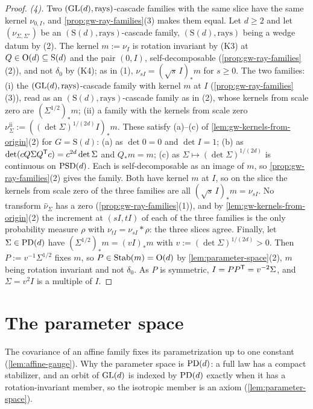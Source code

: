 \begin{proof}
\emph{(4).} Two $(\mathrm{GL}(d), \text{rays})$-cascade families with the same slice have the same kernel
$\nu_{0,I}$, and \ref{prop:gw-ray-families}(3) makes them equal. Let $d \ge 2$ and let
$(\nu_{\Sigma,\Sigma'})$ be an $(\mathrm S(d), \text{rays})$-cascade family, $(\mathrm S(d),
\text{rays})$ being a wedge datum by (2). The kernel
$m := \nu_I$ is rotation invariant by (K3) at $Q \in \mathrm{O}(d) \subseteq \mathrm S(d)$ and the pair
$(0, I)$, self-decomposable (\ref{prop:gw-ray-families}(2)), and not $\delta_0$ by (K4); as in (1),
$\nu_{sI} = (\sqrt s\,I)_*m$ for $s \ge 0$. The two families: (i) the
$(\mathrm{GL}(d), \text{rays})$-cascade family with kernel $m$ at $I$ (\ref{prop:gw-ray-families}(3)), read as
an $(\mathrm S(d), \text{rays})$-cascade family as in (2), whose kernels from scale zero are
$(\Sigma^{1/2})_*m$; (ii) a family with the kernels from scale zero
$\nu^{\mathrm{ii}}_\Sigma := ((\det\Sigma)^{1/(2d)}I)_*m$. These satisfy (a)--(c) of
\ref{lem:gw-kernels-from-origin}(2) for $G = \mathrm S(d)$: (a) as $\det 0 = 0$ and $\det I = 1$;
(b) as $\det(cQ\Sigma Q^{\mathsf{T}}c) = c^{2d}\det\Sigma$ and $Q_*m = m$; (c) as
$\Sigma \mapsto (\det\Sigma)^{1/(2d)}$ is continuous on $\mathrm{PSD}(d)$. Each is self-decomposable as an
image of $m$, so \ref{prop:gw-ray-families}(2) gives the family. Both have kernel $m$ at $I$, so on
the slice the kernels from scale zero of the three families are all $(\sqrt s\,I)_*m = \nu_{sI}$. No
transform $\widehat\nu_\Sigma$ has a zero (\ref{prop:gw-ray-families}(1)), and by
\ref{lem:gw-kernels-from-origin}(2) the increment at $(sI, tI)$ of each of the three families is the
only probability measure $\rho$ with $\nu_{tI} = \nu_{sI} * \rho$: the three slices agree. Finally, let
$\Sigma \in \mathrm{PD}(d)$ have $(\Sigma^{1/2})_*m = (vI)_*m$ with $v := (\det\Sigma)^{1/(2d)} > 0$. Then
$P := v^{-1}\Sigma^{1/2}$ fixes $m$, so $P \in \operatorname{Stab}(m) = \mathrm{O}(d)$ by
\ref{lem:parameter-space}(2), $m$ being rotation invariant and not $\delta_0$. As $P$ is symmetric,
$I = PP^{\mathsf{T}} = v^{-2}\Sigma$, and $\Sigma = v^2I$ is a multiple of $I$.
\end{proof}

\section{The parameter space}
\label{sec:parameter-space}

The covariance of an affine family fixes its parametrization up to one constant
(\ref{lem:affine-gauge}). Why the parameter space is $\mathrm{PD}(d)$: a full law has a compact stabilizer,
and an orbit of $\mathrm{GL}(d)$ is indexed by $\mathrm{PD}(d)$ exactly when it has a rotation-invariant member, so
the isotropic member is an axiom (\ref{lem:parameter-space}).

